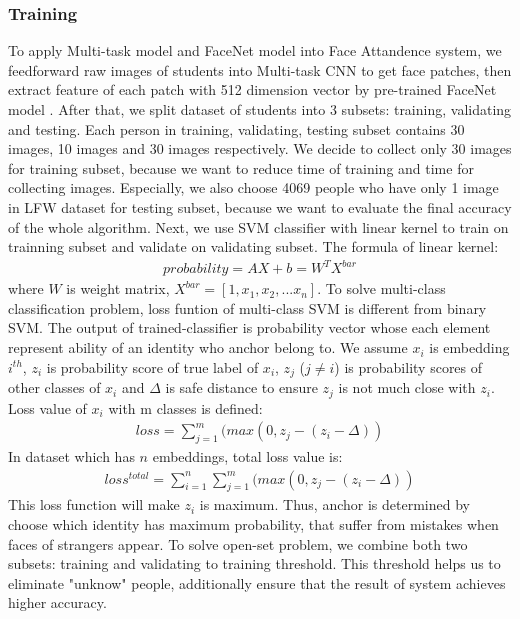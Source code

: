 \documentclass[journal, twocolumn]{IEEEtran}
\begin{document}
\subsubsection{Training} 
To apply Multi-task model and FaceNet model into Face Attandence system, we feedforward raw images of students into Multi-task CNN to get face patches, then extract feature of each patch with 512 dimension vector by pre-trained FaceNet model \cite{ref:facenet}. After that, we split dataset of students into 3 subsets: training, validating and testing. Each person in training, validating, testing subset contains 30 images, 10 images and 30 images respectively. We decide to collect only 30 images for training subset, because we want to reduce time of training and time for collecting images. Especially, we also choose 4069 people who have only 1 image in LFW dataset for testing subset, because we want to evaluate the final accuracy of the whole algorithm. Next, we use SVM classifier with linear kernel to train on trainning subset and validate on validating subset. The formula of linear kernel:
\begin{align}
	probability = AX + b = W^TX^{bar} 
\end{align}
where $W$ is weight matrix, $X^{bar}=[1,x_1,x_2,...x_n]$. To solve multi-class classification problem, loss funtion of multi-class SVM is different from binary SVM. The output of trained-classifier is probability vector whose each element represent ability of an identity who anchor belong to. We assume $x_i$ is embedding $i^{th}$, $z_i$ is probability score of true label of $x_i$, $z_j$ ($j\ne i$) is probability scores of other classes of $x_i$ and $\Delta$ is safe distance to ensure $z_j$ is not much close with $z_i$. Loss value of $x_i$ with m classes is defined:
\begin{align}
	loss = \sum_{j=1}^m(max(0,z_j-(z_i-\Delta))
\end{align}
In dataset which has $n$ embeddings, total loss value is:
\begin{align}
	loss^{total} = \sum_{i=1}^n\sum_{j=1}^m(max(0,z_j-(z_i-\Delta))
\end{align}
This loss function will make $z_i$ is maximum. Thus, anchor is determined by choose which identity has maximum probability, that suffer from mistakes when faces of strangers appear. To solve open-set problem, we combine both two subsets: training and validating to training threshold. This threshold helps us to eliminate "unknow" people, additionally ensure that the result of system achieves higher accuracy.
\end{document}
